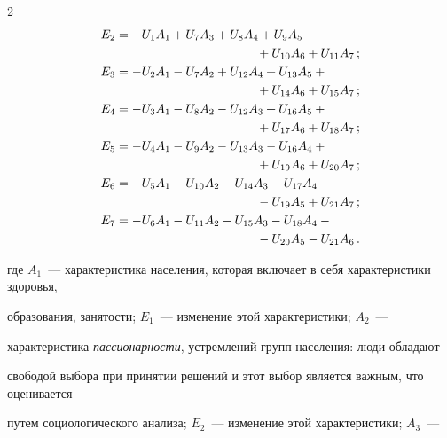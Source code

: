 \begin{multicols}{2}
\begin{align*}
      E_2 &= - U_1A_1 + U_7A_3 + U_8A_4 + U_9A_5 +{}\\


&\hspace{40mm}{}+ U_{10}A_6 + U_{11}A_7\,;\\


      E_3 &= - U_2A_1 - U_7A_2 + U_{12}A_4 + U_{13}A_5 + {}\\


&\hspace{40mm}{}+U_{14}A_6 + U_{15}A_7\,;\\


      E_4 &= - U_3A_1 - U_8A_2 - U_{12}A_3 + U_{16}A_5 +{}\\


&\hspace{40mm}{}+ U_{17}A_6 + U_{18}A_7\,;\\


      E_5 &= - U_4A_1 - U_9A_2 - U_{13}A_3 - U_{16}A_4 +{}\\


&\hspace{40mm}{}+ U_{19}A_6 + U_{20}A_7\,;\\


      E_6 &= - U_5A_1 - U_{10}A_2 - U_{14}A_3 - U_{17}A_4 -{}\\


&\hspace{40mm}{}- U_{19}A_5 + U_{21}A_7\,;\\


      E_7 & = - U_6A_1 - U_{11}A_2 -U_{15}A_3 - U_{18}A_4 - {}\\


&\hspace{40mm}{}-U_{20}A_5 - U_{21}A_6\,.




      \end{align*}


где $A_1$~--- характеристика населения, которая включает в себя характеристики здоровья, 


образования, занятости; $E_1$~--- изменение этой характеристики; $A_2$~--- 


характеристика \textit{пассионарности}, устремлений групп населения: люди обладают 


свободой выбора при принятии решений и этот выбор является важным, что оценивается 


путем социологического анализа; $E_2$~--- изменение этой характеристики; $A_3$~--- 



\end{multicols}
